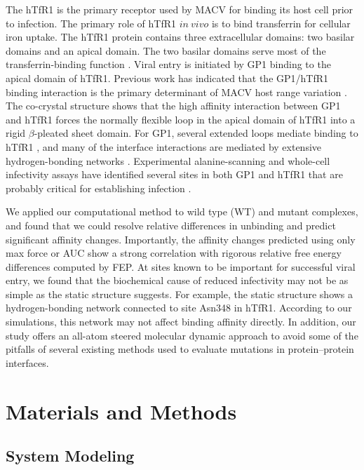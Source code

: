 \documentclass[12pt]{article}
\begin{document}
The hTfR1 is the primary receptor used by MACV for binding its host cell prior to infection. The primary role of hTfR1 $in~vivo$ is to bind transferrin for cellular iron uptake. The hTfR1 protein contains three extracellular domains: two basilar domains and an apical domain. The two basilar domains serve most of the transferrin-binding function \citep{Abraham2010,Rad20112}. Viral entry is initiated by GP1 binding to the apical domain of hTfR1. Previous work has indicated that the GP1/hTfR1 binding interaction is the primary determinant of MACV host range variation \citep{Rad20111,Rad20112}. The co-crystal structure shows that the high affinity interaction between GP1 and hTfR1 forces the normally flexible loop in the apical domain of hTfR1 into a rigid $\beta$-pleated sheet domain. For GP1, several extended loops mediate binding to hTfR1 \citep{Abraham2010,Rad20112}, and many of the interface interactions are mediated by extensive hydrogen-bonding networks \citep{Abraham2010}. Experimental alanine-scanning and whole-cell infectivity assays have identified several sites in both GP1 and hTfR1 that are probably critical for establishing infection \citep{Rad20111,Rad20112}.

We applied our computational method to wild type (WT) and mutant complexes, and found that we could resolve relative differences in unbinding and predict significant affinity changes. Importantly, the affinity changes predicted using only max force or AUC show a strong correlation with rigorous relative free energy differences computed by FEP. At sites known to be important for successful viral entry, we found that the biochemical cause of reduced infectivity may not be as simple as the static structure suggests. For example, the static structure shows a hydrogen-bonding network connected to site Asn348 in hTfR1. According to our simulations, this network may not affect binding affinity directly. In addition, our study offers an all-atom steered molecular dynamic approach to avoid some of the pitfalls of several existing methods used to evaluate mutations in protein--protein interfaces.

\section{Materials and Methods}

\subsection{System Modeling}
\end{document}
